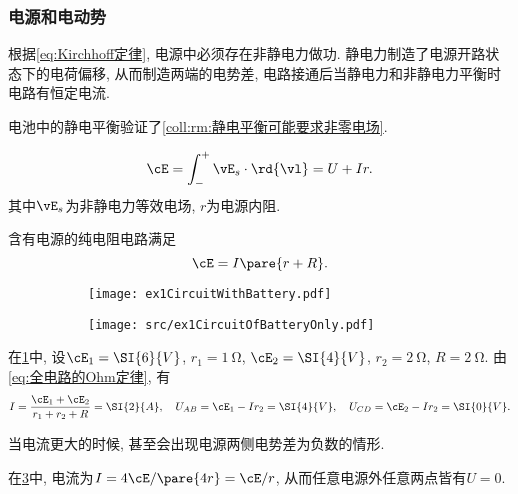 \documentclass[../Electromagnetism.tex]{subfiles}
\begin{document}

\subsubsection{电源和电动势} %
\label{ssub:电源和电动势}

根据\eqref{eq:Kirchhoff定律}, 电源中必须存在非静电力做功. 静电力制造了电源开路状态下的电荷偏移, 从而制造两端的电势差, 电路接通后当静电力和非静电力平衡时电路有恒定电流.
\begin{remark}
	电池中的静电平衡验证了\cref{coll:rm:静电平衡可能要求非零电场}.
\end{remark}
\begin{finale}
	\begin{corollary}[含电源电路的Ohm定律]\quad
		\[ \cE = \int_-^+ \vE_s\cdot\rd{\vl} = U + Ir. \]
		其中$\vE_s$为非静电力等效电场, $r$为电源内阻.
	\end{corollary}
\end{finale}
\begin{corollary}[全电路的Ohm定律]
	含有电源的纯电阻电路满足
	\begin{equation}
		\label{eq:全电路的Ohm定律}
		\cE = I\pare{r+R}.
	\end{equation}
\end{corollary}
\begin{figure}
	\centering
	\begin{subfigure}{.45\textwidth}
		\centering
			\texttt{[image: ex1CircuitWithBattery.pdf]}
		\caption{}
		\label{fig:含电源电路示例1}
	\end{subfigure}
	\begin{subfigure}{.45\textwidth}
		\centering
			\texttt{[image: src/ex1CircuitOfBatteryOnly.pdf]}
		\caption{}
		\label{fig:纯电源电路示例1}
	\end{subfigure}
\end{figure}
\begin{ex}
	在\cref{fig:含电源电路示例1}中, 设$\cE_1 = \SI{6}{V}$, $r_1 = \SI{1}{\ohm}$, $\cE_2 = \SI{4}{V}$, $r_2 = \SI{2}{\ohm}$, $R = \SI{2}{\ohm}$. 由\eqref{eq:全电路的Ohm定律}, 有
	\[ I = \frac{\cE_1 + \cE_2}{r_1 + r_2 + R} = \SI{2}{A},\quad U_{AB} = \cE_1 - Ir_2 = \SI{4}{V},\quad U_{CD} = \cE_2 - Ir_2 = \SI{0}{V}. \]
\end{ex}
\begin{remark}
	当电流更大的时候, 甚至会出现电源两侧电势差为负数的情形.
\end{remark}
\begin{ex}
	在\cref{fig:纯电源电路示例1}中, 电流为$I = 4\cE/\pare{4r} = \cE/r$, 从而任意电源外任意两点皆有$U = 0$.
\end{ex}
\end{document}
